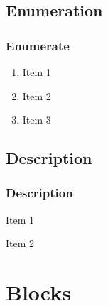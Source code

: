 \documentclass[aspectratio=169]{beamer}
\begin{document}
\subsection{Enumeration}
\begin{frame}
	\frametitle{Enumerate}
	\begin{enumerate}	
		\item <1-> Item 1
		\item <2-3>Item 2
		\item <3> Item 3
	\end{enumerate}	
\end{frame}


\subsection{Description}
\begin{frame}
	\frametitle{Description}
		\begin{description}
			\item <1> [One] Item 1
			\item <2> [Two] Item 2
		\end{description}
\end{frame}	

\section{Blocks}
\end{document}

